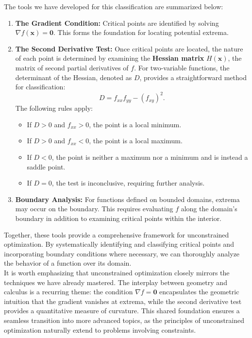 \noindent The tools we have developed for this classification are summarized below:
\begin{enumerate}
    \item \textbf{The Gradient Condition:} Critical points are identified by solving \( \nabla f(\mathbf{x}) = \mathbf{0} \). This forms the foundation for locating potential extrema.

    \item \textbf{The Second Derivative Test:} Once critical points are located, the nature of each point is determined by examining the \textbf{Hessian matrix} \( H(\mathbf{x}) \), the matrix of second partial derivatives of \( f \). For two-variable functions, the determinant of the Hessian, denoted as \( D \), provides a straightforward method for classification:
    \[
    D = f_{xx} f_{yy} - (f_{xy})^2.
    \]
    The following rules apply:
    \begin{itemize}
        \item If \( D > 0 \) and \( f_{xx} > 0 \), the point is a local minimum.
        \item If \( D > 0 \) and \( f_{xx} < 0 \), the point is a local maximum.
        \item If \( D < 0 \), the point is neither a maximum nor a minimum and is instead a saddle point.
        \item If \( D = 0 \), the test is inconclusive, requiring further analysis.
    \end{itemize}

    \item \textbf{Boundary Analysis:} For functions defined on bounded domains, extrema may occur on the boundary. This requires evaluating \( f \) along the domain's boundary in addition to examining critical points within the interior.
\end{enumerate}

\noindent Together, these tools provide a comprehensive framework for unconstrained optimization. By systematically identifying and classifying critical points and incorporating boundary conditions where necessary, we can thoroughly analyze the behavior of a function over its domain. \\

\noindent It is worth emphasizing that unconstrained optimization closely mirrors the techniques we have already mastered. The interplay between geometry and calculus is a recurring theme: the condition \( \nabla f = \mathbf{0} \) encapsulates the geometric intuition that the gradient vanishes at extrema, while the second derivative test provides a quantitative measure of curvature. This shared foundation ensures a seamless transition into more advanced topics, as the principles of unconstrained optimization naturally extend to problems involving constraints.


